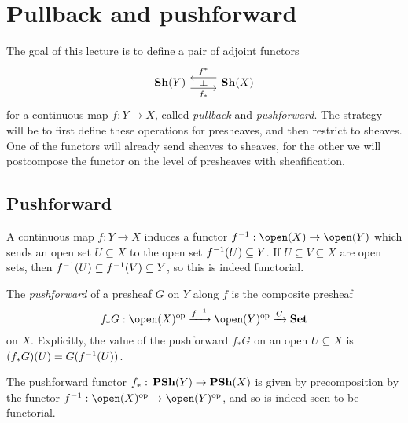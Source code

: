 \chapter{Pullback and pushforward}

\noindent
The goal of this lecture is to define a pair of adjoint functors
\begin{equation*}
  \begin{tikzcd}
    \catSheaf(Y) \ar[r, "f_*"'{name=rightadj}, shift right=2] &
    \catSheaf(X) \ar[l, "f^*"'{name=leftadj}, shift right=2]
    \ar[from=leftadj, to=rightadj, phantom, "\leftadj" rotate=-90]
  \end{tikzcd}
\end{equation*}
for a continuous map \(f\colon Y\to X\), called \emph{pullback} and \emph{pushforward}.
The strategy will be to first define these operations for presheaves, and then restrict to sheaves.
One of the functors will already send sheaves to sheaves, for the other we will postcompose the functor on the level of presheaves with sheafification.

\section{Pushforward}

A continuous map \(f\colon Y\to X\) induces a functor \(f\inv\colon\open(X)\to\open(Y)\) which sends an open set \(U\subseteq X\) to the open set \(f^{-1}(U)\subseteq Y\).
If \(U\subseteq V\subseteq X\) are open sets, then \(f^{-1}(U)\subseteq f^{-1}(V)\subseteq Y\), so this is indeed functorial.

\begin{defn}
The \emph{pushforward} of a presheaf \(G\) on \(Y\) along \(f\) is the composite presheaf
\begin{equation*}
  f_*G \colon \open(X)\opp \xrightarrow{f\inv} \open(Y)\opp \xrightarrow{G} \catSet
\end{equation*}
on \(X\).
Explicitly, the value of the pushforward \(f_*G\) on an open \(U\subseteq X\) is \((f_*G)(U) = G(f^{-1}(U))\).
\end{defn}

The pushforward functor \(f_*\colon\catPresheaf(Y)\to\catPresheaf(X)\) is given by precomposition by the functor \(f\inv\colon\open(X)\opp\to\open(Y)\opp\), and so is indeed seen to be functorial.

